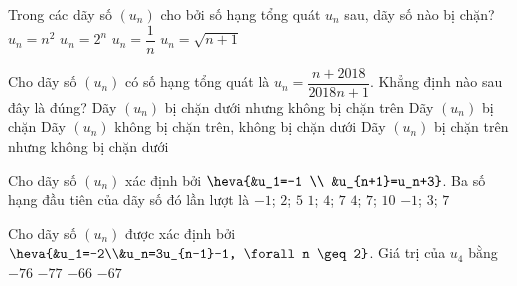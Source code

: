 \begin{ex}%
	 Trong các dãy số $(u_n)$ cho bởi số hạng tổng quát $u_n$ sau, dãy số nào bị chặn?
	\choice 
		{$u_n = n^2$} 
		{$u_n = 2^n$} 
		{\True $u_n =  \dfrac{1}{n}$}
		{$u_n = \sqrt{n+1}$} 
\end{ex}

\begin{ex}%
	Cho dãy số  $(u_n)$ có số hạng tổng quát là $u_n = \dfrac{n + 2018}{2018n+1}$. Khẳng định nào sau đây là đúng?
	\choice 
		{Dãy $(u_n)$ bị chặn dưới nhưng không bị chặn  trên}
		{\True Dãy  $(u_n)$ bị chặn}
		{Dãy $(u_n)$ không bị chặn trên, không bị chặn  dưới}
		{ Dãy $(u_n)$ bị  chặn trên nhưng không bị chặn dưới}
\end{ex}

\begin{ex}%
	Cho dãy số $(u_n)$ xác định bởi 
	 $\heva{&u_1=-1 \\
	&u_{n+1}=u_n+3}$.  Ba số hạng đầu tiên của dãy số đó lần lượt là
	 \choice
		{\True $-1$; $2$; $5$} 
		{$1$;  $4$; $7$}
		{$4$; $7$; $10$} 
		{$-1$; $3$;  $7$}
\end{ex}

\begin{ex}%
	Cho dãy  số $(u_n)$ được xác định bởi $\heva{&u_1=-2\\&u_n=3u_{n-1}-1, \forall n \geq 2}$. Giá trị của $u_4$ bằng
	 \choice
		 {$-76$}
		 {$-77$}
		{$-66$} 
		{\True $-67$} 
\end{ex}

